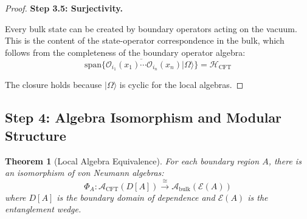 \documentclass[12pt,a4paper]{article}
\newtheorem{theorem}{Theorem}[section]
\begin{document}
\begin{proof}
\textbf{Step 3.5: Surjectivity.}

Every bulk state can be created by boundary operators acting on the vacuum. This is the content of the state-operator correspondence in the bulk, which follows from the completeness of the boundary operator algebra:
\begin{equation}
\overline{\text{span}\{\mathcal{O}_{i_1}(x_1)\cdots\mathcal{O}_{i_n}(x_n)|\Omega\rangle\}} = \mathcal{H}_{\text{CFT}}
\end{equation}

The closure holds because $|\Omega\rangle$ is cyclic for the local algebras.
\end{proof}

\subsection{Step 4: Algebra Isomorphism and Modular Structure}

\begin{theorem}[Local Algebra Equivalence]\label{thm:algebra-equiv}
For each boundary region $A$, there is an isomorphism of von Neumann algebras:
\begin{equation}
\Phi_A: \mathcal{A}_{\text{CFT}}(D[A]) \xrightarrow{\cong} \mathcal{A}_{\text{bulk}}(\mathcal{E}(A))
\end{equation}
where $D[A]$ is the boundary domain of dependence and $\mathcal{E}(A)$ is the entanglement wedge.
\end{theorem}
\end{document}

